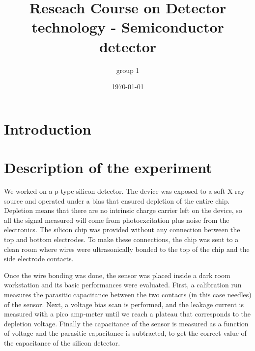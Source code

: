 \documentclass[12pt]{article}
\title{Reseach Course on Detector technology - Semiconductor detector}
\author{group 1}
\date{\today}
\begin{document}

\maketitle
  
\tableofcontents
  
  
  
  
\cleardoublepage

\section{Introduction}

\section{Description of the experiment}

We worked on a p-type silicon detector. The device was exposed to a soft X-ray source and operated under a bias that ensured depletion of the entire chip. Depletion means that there are no intrinsic charge carrier left on the device, so all the signal measured will come from photoexcitation plus noise from the electronics. The silicon chip was provided without any connection between the top and bottom electrodes. To make these connections, the chip was sent to a clean room where wires were ultrasonically bonded to the top of the chip and the side electrode contacts.

Once the wire bonding was done, the sensor was placed inside a dark room workstation and its basic performances were evaluated. First, a calibration run measures the parasitic capacitance between the two contacts (in this case needles) of the sensor. Next, a voltage bias scan is performed, and the leakage current is measured with a pico amp-meter until we reach a plateau that corresponds to the depletion voltage. Finally the capacitance of the sensor is measured as a function of voltage and the parasitic capacitance is subtracted, to get the correct value of the capacitance of the silicon detector.
\end{document}
